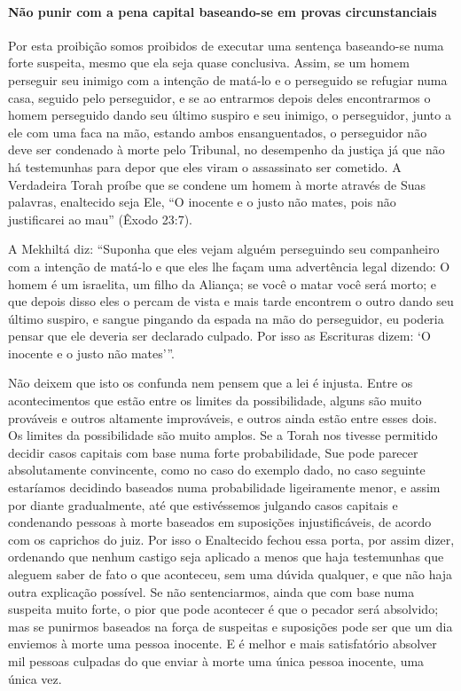 \paragraph{Não punir com a pena capital baseando-se em provas circunstanciais}

Por esta proibição somos proibidos de executar uma sentença baseando-se
numa forte suspeita, mesmo que ela seja quase conclusiva. Assim, se um
homem perseguir seu inimigo com a intenção de matá-lo e o perseguido se
refugiar numa casa, seguido pelo perseguidor, e se ao entrarmos depois
deles encontrarmos o homem perseguido dando seu último suspiro e seu
inimigo, o perseguidor, junto a ele com uma faca na mão, estando ambos
ensanguentados, o perseguidor não deve ser condenado à morte pelo
Tribunal, no desempenho da justiça já que não há testemunhas para depor
que eles viram o assassinato ser cometido. A Verdadeira Torah proíbe que
se condene um homem à morte através de Suas palavras, enaltecido seja
Ele, ``O inocente e o justo não mates, pois não justificarei ao mau''
(Êxodo 23:7).

A Mekhiltá diz: ``Suponha que eles vejam alguém perseguindo seu
companheiro com a intenção de matá-lo e que eles lhe façam uma
advertência legal dizendo: O homem é um israelita, um filho da Aliança;
se você o matar você será morto; e que depois disso eles o percam de
vista e mais tarde encontrem o outro dando seu último suspiro, e sangue
pingando da espada na mão do perseguidor, eu poderia pensar que ele
deveria ser declarado culpado. Por isso as Escrituras dizem: `O inocente
e o justo não mates'''.

Não deixem que isto os confunda nem pensem que a lei é injusta. Entre os
acontecimentos que estão entre os limites da possibilidade, alguns são
muito prováveis e outros altamente improváveis, e outros ainda estão
entre esses dois. Os limites da possibilidade são muito amplos. Se a
Torah nos tivesse permitido decidir casos capitais com base numa forte
probabilidade, Sue pode parecer absolutamente convincente, como no caso
do exemplo dado, no caso seguinte estaríamos decidindo baseados numa
probabilidade ligeiramente menor, e assim por diante gradualmente, até
que estivéssemos julgando casos capitais e condenando pessoas à morte
baseados em suposições injustificáveis, de acordo com os caprichos do
juiz. Por isso o Enaltecido fechou essa porta, por assim dizer,
ordenando que nenhum castigo seja aplicado a menos que haja testemunhas
que aleguem saber de fato o que aconteceu, sem uma dúvida qualquer, e
que não haja outra explicação possível. Se não sentenciarmos, ainda que
com base numa suspeita muito forte, o pior que pode acontecer é que o
pecador será absolvido; mas se punirmos baseados na força de suspeitas e
suposições pode ser que um dia enviemos à morte uma pessoa inocente. E é
melhor e mais satisfatório absolver mil pessoas culpadas do que enviar à
morte uma única pessoa inocente, uma única vez.

